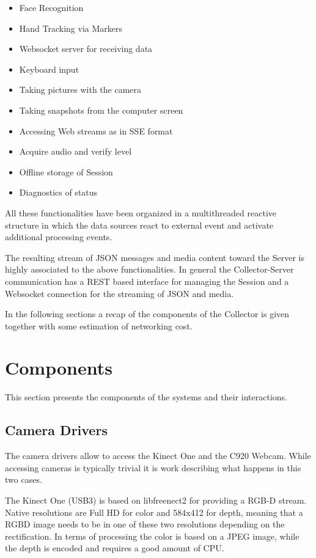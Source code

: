 \documentclass[a4paper,notitlepage,onecolumn]{hitec}  %
\begin{document}
\begin{itemize}
	\item Face Recognition
	\item Hand Tracking via Markers
	\item Websocket server for receiving data
	\item Keyboard input
	\item Taking pictures with the camera
	\item Taking snapshots from the computer screen
	\item Accessing Web streams as in SSE format
	\item Acquire audio and verify level
	\item Offline storage of Session
	\item Diagnostics of status
\end{itemize}

All these functionalities have been organized in a multithreaded reactive structure in which the data sources react to external event and activate additional processing events.

The resulting stream of JSON messages and media content toward the Server is highly associated to the above functionalities. In general the Collector-Server communication has a REST based interface for managing the Session and a Websocket connection for the streaming of JSON and media.

In the following sections a recap of the components of the Collector is given together with some estimation of networking cost.

\section{Components}

This section presents the components of the systems and their interactions. 

\subsection{Camera Drivers}
The camera drivers allow to access the Kinect One and the C920 Webcam. While accessing cameras is typically trivial it is work describing what happens in this two cases.

The Kinect One (USB3) is based on libfreenect2 for providing a RGB-D stream. Native resolutions are Full HD for color and 584x412 for depth, meaning that a RGBD image needs to be in one of these two resolutions depending on the rectification. In terms of processing the color is based on a JPEG image, while the depth is encoded and requires a good amount of CPU.
\end{document}
